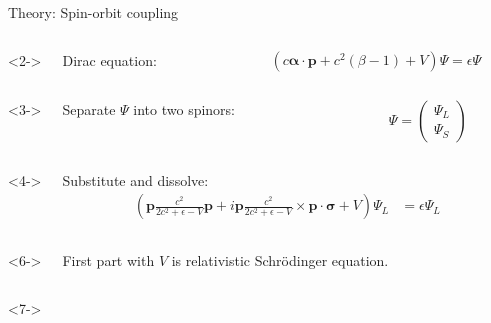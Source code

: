 \begin{frame}{Theory: Spin-orbit coupling}
	\begin{columns}<2->
		\begin{column}{.5\linewidth}
			Dirac equation:
		\end{column}\hspace{-3.3cm}
		\begin{column}{.7\linewidth}
			\begin{equation*}
			\left(
			c \boldsymbol\alpha \cdot \boldsymbol{p} + c^2(\beta - 1) + V
			\right) \Psi = \epsilon \Psi
			\end{equation*}
		\end{column}
	\end{columns}
	\begin{columns}<3->
		\begin{column}{.6\linewidth}
			Separate $\Psi$ into two spinors:
		\end{column}\hspace{-5cm}
		\begin{column}{.4\linewidth}
			\begin{equation*}
			\Psi = 
			\begin{pmatrix}
			\Psi_L \\ \Psi_S
			\end{pmatrix}
			\end{equation*}	
		\end{column}
	\end{columns}
	\begin{columns}<4->
		\begin{column}{\linewidth}
			Substitute and dissolve:
			\begin{align*}
			\left(
			\boldsymbol{p} \frac{c^2}{2c^2 + \epsilon - V} \boldsymbol{p} 
			+ i \boldsymbol{p} \frac{c^2}{2c^2 + \epsilon - V} \times \boldsymbol{p} \cdot \boldsymbol{\sigma} 
			+ V 
			\right) \Psi_L 
			&= \epsilon \Psi_L	
			\end{align*}
		\end{column}
	\end{columns}
	\vspace{.3cm}
	\begin{columns}<6->
		\begin{column}{\linewidth}
			First part with $V$ is relativistic Schrödinger equation.
		\end{column}
	\end{columns}
	\begin{columns}<7->
		\begin{column}{\linewidth}

\end{column}
\end{columns}
\end{frame}
